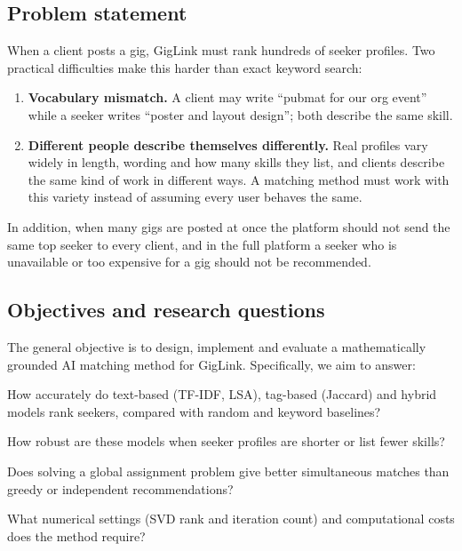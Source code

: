 \documentclass[12pt,a4paper]{article}
\numberwithin{equation}{section}
\theoremstyle{definition}
\theoremstyle{plain}
\begin{document}
\subsection{Problem statement}
When a client posts a gig, GigLink must rank hundreds of seeker profiles. Two practical difficulties make this harder than exact keyword search:
\begin{enumerate}[nosep]
  \item \textbf{Vocabulary mismatch.} A client may write \enquote{pubmat for our org event} while a seeker writes \enquote{poster and layout design}; both describe the same skill.
  \item \textbf{Different people describe themselves differently.} Real profiles vary widely in length, wording and how many skills they list, and clients describe the same kind of work in different ways. A matching method must work with this variety instead of assuming every user behaves the same.
\end{enumerate}
In addition, when many gigs are posted at once the platform should not send the same top seeker to every client, and in the full platform a seeker who is unavailable or too expensive for a gig should not be recommended.

\subsection{Objectives and research questions}
The general objective is to design, implement and evaluate a mathematically grounded AI matching method for GigLink. Specifically, we aim to answer:
\begin{description}[nosep,font=\normalfont\bfseries]
  \item[RQ1] How accurately do text-based (TF-IDF, LSA), tag-based (Jaccard) and hybrid models rank seekers, compared with random and keyword baselines?
  \item[RQ2] How robust are these models when seeker profiles are shorter or list fewer skills?
  \item[RQ3] Does solving a global assignment problem give better simultaneous matches than greedy or independent recommendations?
  \item[RQ4] What numerical settings (SVD rank and iteration count) and computational costs does the method require?
\end{description}
\end{document}

